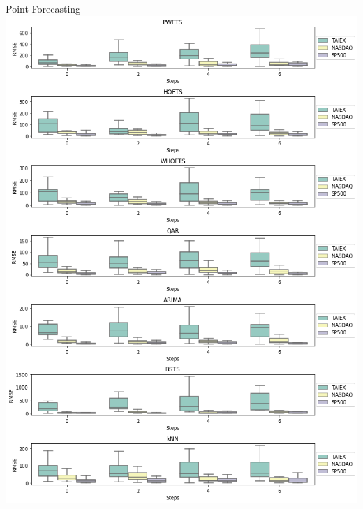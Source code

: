 \documentclass{beamer}
\begin{document}
\begin{frame}{Point Forecasting}
\includegraphics[width=\textwidth]{figures/pwfts_ahead_point.png}
\end{frame}
\end{document}
